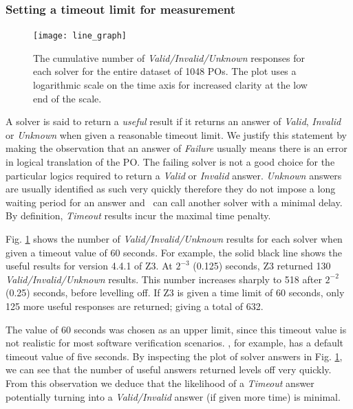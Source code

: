 \subsubsection{Setting a timeout limit for measurement}
\label{sub:timeout-limit}

\begin{figure}
	\centering
	\texttt{[image: line\_graph]}
	\caption[Cumulative number of useful responses for each solver over 60 seconds]{The cumulative number of \textit{Valid/Invalid/Unknown} responses for each solver for the entire dataset of 1048 POs. The plot uses a logarithmic scale on the time axis for increased clarity at the low end of the scale.}
	\label{fig:line_graph}
\end{figure}

\sloppypar
A solver is said to return a \textit{useful} result if it returns an answer of \textit{Valid}, \textit{Invalid} or \textit{Unknown} when given a reasonable timeout limit.
We justify this statement by making the observation that an answer of \textit{Failure} usually means there is an error in logical translation of the PO. 
The failing solver is not a good choice for the particular logics required to return a \textit{Valid} or \textit{Invalid} answer.
\textit{Unknown} answers are usually identified as such very quickly therefore they do not impose a long waiting period for an answer and \where~can call another solver with a minimal delay.
By definition, \textit{Timeout} results incur the maximal time penalty.  
    
Fig. \ref{fig:line_graph} shows the number of \textit{Valid/Invalid/Unknown} results for each solver when given a timeout value of 60 seconds. 
For example, the solid black line shows the useful results for version 4.4.1 of Z3.
At $2^{-3}$ (0.125) seconds, Z3 returned 130 \textit{Valid/Invalid/Unknown} results. 
This number increases sharply to 518 after $2^{-2}$ (0.25) seconds, before levelling off.
If Z3 is given a time limit of 60 seconds, only 125 more useful responses are returned; giving a total of 632.  

The value of 60 seconds was chosen as an upper limit, since this timeout value is not realistic for most software verification scenarios.  
\why, for example, has a default timeout value of five seconds.
By inspecting the plot of solver answers in Fig. \ref{fig:line_graph}, we can see that the number of useful answers returned levels off very quickly. 
From this observation we deduce that the likelihood of a \textit{Timeout} answer potentially turning into a \textit{Valid/Invalid} answer (if given more time) is minimal.  

